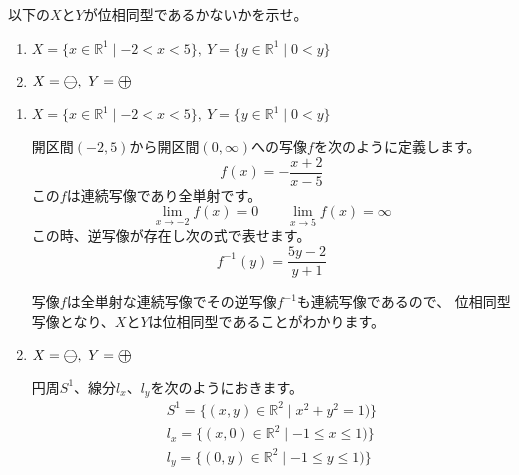\documentclass[12pt,b5paper]{ltjsarticle}
\begin{document}
以下の$X$と$Y$が位相同型であるかないかを示せ。
\begin{enumerate}
 \item $X=\{ x \in\mathbb{R}^1 \mid -2<x<5\},\
       Y=\{y\in\mathbb{R}^1 \mid 0<y\}$
 \item $X=\bigcirc\llap{\small ---},\ Y=\bigcirc\llap{\large +}$
\end{enumerate}
\hrulefill
\begin{enumerate}
 \item $X=\{ x \in\mathbb{R}^1 \mid -2<x<5\},\
       Y=\{y\in\mathbb{R}^1 \mid 0<y\}$

       \dotfill

       開区間$(-2,5)$から開区間$(0,\infty)$への写像$f$を次のように定義します。
       \begin{equation}
        f(x)= -\frac{x+2}{x-5}
       \end{equation}
       この$f$は連続写像であり全単射です。
       \begin{equation}
        \lim_{x\rightarrow -2}f(x)=0 \qquad \lim_{x\rightarrow 5}f(x)=\infty
       \end{equation}
       この時、逆写像が存在し次の式で表せます。
       \begin{equation}
        f^{-1}(y)= \frac{5y-2}{y+1}
       \end{equation}

       写像$f$は全単射な連続写像でその逆写像$f^{-1}$も連続写像であるので、
       位相同型写像となり、$X$と$Y$は位相同型であることがわかります。

       \hrulefill
 \item $X=\bigcirc\llap{\small ---},\ Y=\bigcirc\llap{\large +}$

       \dotfill

       円周$S^1$、線分$l_x$、$l_y$を次のようにおきます。
       \begin{gather}
       S^1=\{ (x,y)\in\mathbb{R}^2 \mid x^2+y^2=1)\}\\
       l_x = \{ (x,0)\in\mathbb{R}^2 \mid -1\leq x \leq 1)\}\\
       l_y = \{ (0,y)\in\mathbb{R}^2 \mid -1\leq y \leq 1)\}
       \end{gather}


\end{enumerate}
\end{document}
